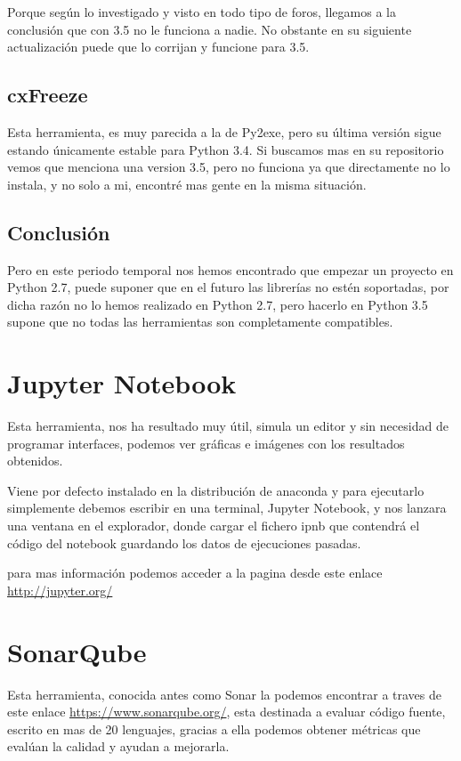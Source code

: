 Porque según lo investigado y visto en todo tipo de foros, llegamos a la conclusión que con 3.5 no le funciona a nadie.
No obstante en su siguiente actualización puede que lo corrijan y funcione para 3.5.

\subsection{cxFreeze}
Esta herramienta, es muy parecida a la de Py2exe, pero su última versión sigue estando únicamente estable para Python 3.4. 
Si buscamos mas en su repositorio vemos que menciona una version 3.5, pero no funciona ya que directamente no lo instala, y no solo a mi, encontré mas gente en la misma situación.

\subsection{Conclusión}
Pero en este periodo temporal nos hemos encontrado que empezar un proyecto en Python 2.7, puede suponer que en el futuro las librerías no estén soportadas, por dicha razón no lo hemos realizado en Python 2.7, pero hacerlo en Python 3.5 supone que no todas las herramientas son completamente compatibles.

\section{Jupyter Notebook}
\label{notebook:jupiter}
Esta herramienta, nos ha resultado muy útil, simula un editor y sin necesidad de programar interfaces, podemos ver gráficas e imágenes con los resultados obtenidos.

Viene por defecto instalado en la distribución de anaconda y para ejecutarlo simplemente debemos escribir en una terminal, Jupyter Notebook, y nos lanzara una ventana en el explorador, donde cargar el fichero ipnb que contendrá el código del notebook guardando los datos de ejecuciones pasadas.


para mas información podemos acceder a la pagina desde este enlace \url{http://jupyter.org/}

\section{SonarQube}
Esta herramienta, conocida antes como Sonar la podemos encontrar a traves de este enlace \url{https://www.sonarqube.org/}, esta destinada a evaluar código fuente, escrito en mas de 20 lenguajes, gracias a ella podemos obtener métricas que evalúan la calidad y ayudan a mejorarla.

